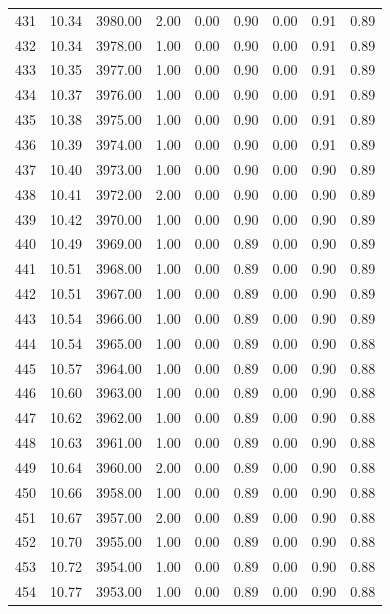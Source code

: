 \documentclass{article}\usepackage[]{graphicx}\usepackage[]{color}
\begin{document}
\begin{longtable}{rrrrrrrrr}
  431 & 10.34 & 3980.00 & 2.00 & 0.00 & 0.90 & 0.00 & 0.91 & 0.89 \\ 
  432 & 10.34 & 3978.00 & 1.00 & 0.00 & 0.90 & 0.00 & 0.91 & 0.89 \\ 
  433 & 10.35 & 3977.00 & 1.00 & 0.00 & 0.90 & 0.00 & 0.91 & 0.89 \\ 
  434 & 10.37 & 3976.00 & 1.00 & 0.00 & 0.90 & 0.00 & 0.91 & 0.89 \\ 
  435 & 10.38 & 3975.00 & 1.00 & 0.00 & 0.90 & 0.00 & 0.91 & 0.89 \\ 
  436 & 10.39 & 3974.00 & 1.00 & 0.00 & 0.90 & 0.00 & 0.91 & 0.89 \\ 
  437 & 10.40 & 3973.00 & 1.00 & 0.00 & 0.90 & 0.00 & 0.90 & 0.89 \\ 
  438 & 10.41 & 3972.00 & 2.00 & 0.00 & 0.90 & 0.00 & 0.90 & 0.89 \\ 
  439 & 10.42 & 3970.00 & 1.00 & 0.00 & 0.90 & 0.00 & 0.90 & 0.89 \\ 
  440 & 10.49 & 3969.00 & 1.00 & 0.00 & 0.89 & 0.00 & 0.90 & 0.89 \\ 
  441 & 10.51 & 3968.00 & 1.00 & 0.00 & 0.89 & 0.00 & 0.90 & 0.89 \\ 
  442 & 10.51 & 3967.00 & 1.00 & 0.00 & 0.89 & 0.00 & 0.90 & 0.89 \\ 
  443 & 10.54 & 3966.00 & 1.00 & 0.00 & 0.89 & 0.00 & 0.90 & 0.89 \\ 
  444 & 10.54 & 3965.00 & 1.00 & 0.00 & 0.89 & 0.00 & 0.90 & 0.88 \\ 
  445 & 10.57 & 3964.00 & 1.00 & 0.00 & 0.89 & 0.00 & 0.90 & 0.88 \\ 
  446 & 10.60 & 3963.00 & 1.00 & 0.00 & 0.89 & 0.00 & 0.90 & 0.88 \\ 
  447 & 10.62 & 3962.00 & 1.00 & 0.00 & 0.89 & 0.00 & 0.90 & 0.88 \\ 
  448 & 10.63 & 3961.00 & 1.00 & 0.00 & 0.89 & 0.00 & 0.90 & 0.88 \\ 
  449 & 10.64 & 3960.00 & 2.00 & 0.00 & 0.89 & 0.00 & 0.90 & 0.88 \\ 
  450 & 10.66 & 3958.00 & 1.00 & 0.00 & 0.89 & 0.00 & 0.90 & 0.88 \\ 
  451 & 10.67 & 3957.00 & 2.00 & 0.00 & 0.89 & 0.00 & 0.90 & 0.88 \\ 
  452 & 10.70 & 3955.00 & 1.00 & 0.00 & 0.89 & 0.00 & 0.90 & 0.88 \\ 
  453 & 10.72 & 3954.00 & 1.00 & 0.00 & 0.89 & 0.00 & 0.90 & 0.88 \\ 
  454 & 10.77 & 3953.00 & 1.00 & 0.00 & 0.89 & 0.00 & 0.90 & 0.88 \\ 

\end{longtable}
\end{document}
